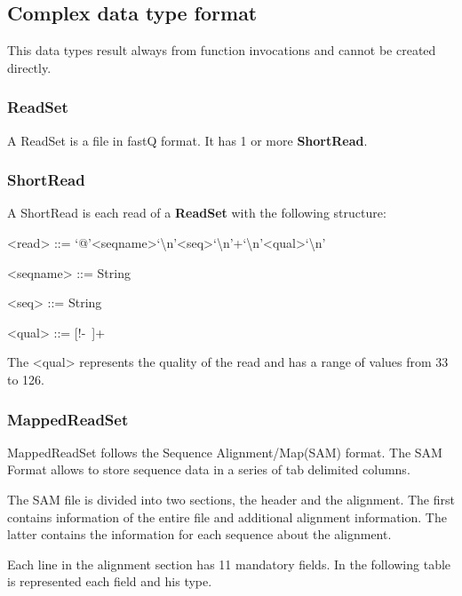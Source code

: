 \documentclass{article}
\begin{document}
\subsection{Complex data type format}

This data types result always from function invocations and cannot be created directly.

\subsubsection{ReadSet}
A ReadSet is a file in fastQ format. It has 1 or more \textbf{ShortRead}.

\subsubsection{ShortRead}
A ShortRead is each read of a \textbf{ReadSet} with the following structure:

\begin{grammar}
<read>    ::= `@'<seqname>`\textbackslash n'<seq>`\textbackslash n'+`\textbackslash n'<qual>`\textbackslash n'

<seqname> ::= String

<seq>     ::= String

<qual>    ::= [!-~]+

\end{grammar}

\noindent
The <qual> represents the quality of the read and has a range of values from 33 to 126.

\subsubsection{MappedReadSet}
MappedReadSet follows the Sequence Alignment/Map(SAM) format. The SAM Format allows to store sequence data in a series of tab delimited columns.

The SAM file is divided into two sections, the header and the alignment. The first contains information of the entire file and additional alignment information. The latter contains the information for each sequence about the alignment. 

Each line in the alignment section has 11 mandatory fields. In the following table is represented each field and his type.
\end{document}
